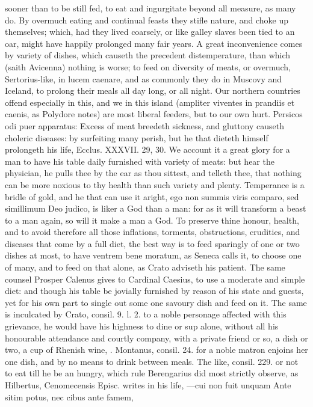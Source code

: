{sooner than to be still fed, to eat and ingurgitate beyond all measure,
as many do.  By overmuch eating and continual feasts they stifle
nature, and choke up themselves; which, had they lived coarsely, or
like galley slaves been tied to an oar, might have happily prolonged
many fair years.
A great inconvenience comes by variety of dishes, which causeth the
precedent distemperature, than which (saith Avicenna) nothing is
worse; to feed on diversity of meats, or overmuch, Sertorius-like, in
lucem caenare, and as commonly they do in Muscovy and Iceland, to
prolong their meals all day long, or all night. Our northern countries
offend especially in this, and we in this island (ampliter viventes in
prandiis et caenis, as Polydore notes) are most liberal feeders,
but to our own hurt. Persicos odi puer apparatus: Excess of meat
breedeth sickness, and gluttony causeth choleric diseases: by
surfeiting many perish, but he that dieteth himself prolongeth his
life, Ecclus. XXXVII. 29, 30. We account it a great glory for a man to
have his table daily furnished with variety of meats: but hear the
physician, he pulls thee by the ear as thou sittest, and telleth thee,
that nothing can be more noxious to thy health than such variety
and plenty. Temperance is a bridle of gold, and he that can use it
aright, ego non summis viris comparo, sed simillimum Deo judico,
is liker a God than a man: for as it will transform a beast to a man
again, so will it make a man a God. To preserve thine honour, health,
and to avoid therefore all those inflations, torments, obstructions,
crudities, and diseases that come by a full diet, the best way is to
feed sparingly of one or two dishes at most, to have ventrem bene
moratum, as Seneca calls it, to choose one of many, and to feed
on that alone, as Crato adviseth his patient. The same counsel
Prosper Calenus gives to Cardinal Caesius, to use a moderate and
simple diet: and though his table be jovially furnished by reason of
his state and guests, yet for his own part to single out some one
savoury dish and feed on it. The same is inculcated by Crato,
consil. 9. l. 2. to a noble personage affected with this grievance, he
would have his highness to dine or sup alone, without all his
honourable attendance and courtly company, with a private friend or so,
a dish or two, a cup of Rhenish wine, \etc{}. Montanus, consil. 24.
for a noble matron enjoins her one dish, and by no means to drink
between meals. The like, consil. 229. or not to eat till he be an
hungry, which rule Berengarius did most strictly observe, as Hilbertus,
Cenomecensis Episc. writes in his life,
---cui non fuit unquam
Ante sitim potus, nec cibus ante famem,

}
